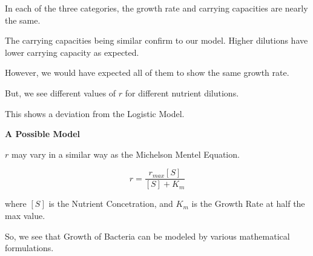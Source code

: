 \documentclass[twocolumn]{article}
\begin{document}
In each of the three categories, the growth rate and carrying capacities are nearly the same.

The carrying capacities being similar confirm to our model. Higher dilutions have lower carrying capacity as expected.


However, we would have expected all of them to show the same growth rate.

But, we see different values of $r$ for different nutrient dilutions. 

This shows a deviation from the Logistic Model. 

\textbf{A Possible Model}

$r$ may vary in a similar way as the Michelson Mentel Equation.

\[ 
    r = \frac{r_{max}[S]}{[S] + K_m}    
\]

where $[S]$ is the Nutrient Concetration, and $K_m$ is the Growth Rate at half the max value. 

So, we see that Growth of Bacteria can be modeled by various mathematical formulations. 
\end{document}
